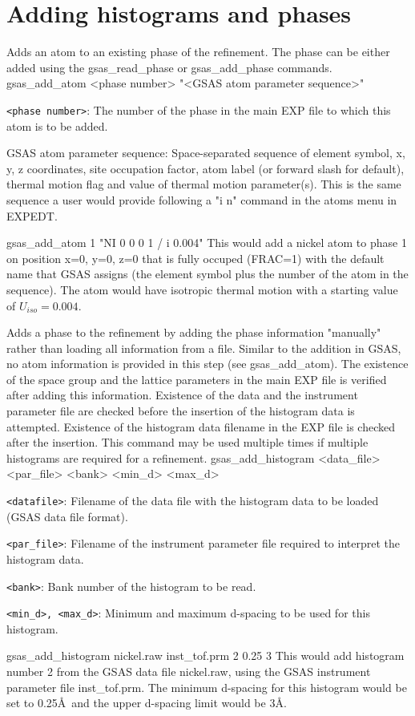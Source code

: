 \section{Adding histograms and phases}

{
Adds an atom to an existing phase of the refinement. The phase can be either added using the gsas\_read\_phase or gsas\_add\_phase commands.
}{
gsas\_add\_atom <phase number> "<GSAS atom parameter sequence>"
}{
\item \texttt{<phase number>}: The number of the phase in the main EXP file to which this atom is to be added.
\item GSAS atom parameter sequence: Space-separated sequence of element symbol, x, y, z coordinates, site occupation factor, atom label (or forward slash for default), thermal motion flag and value of thermal motion parameter(s). This is the same sequence a user would provide following a "i n" command in the atoms menu in EXPEDT.
}{
gsas\_add\_atom 1 "NI 0 0 0 1 / i 0.004"
}{
This would add a nickel atom to phase 1 on position x=0, y=0, z=0 that is fully occuped (FRAC=1) with the default name that GSAS assigns (the element symbol plus the number of the atom in the sequence). The atom would have isotropic thermal motion with a starting value of $U_{iso}=0.004$.
}

{
Adds a phase to the refinement by adding the phase information "manually" rather than loading all information from a file. Similar to the addition in GSAS, no atom information is provided in this step (see gsas\_add\_atom). The existence of the space group and the lattice parameters in the main EXP file is verified after adding this information. Existence of the data and the instrument parameter file are checked before the insertion of the histogram data is attempted. Existence of the histogram data filename in the EXP file is checked after the insertion. This command may be used multiple times if multiple histograms are required for a refinement.
}{
gsas\_add\_histogram <data\_file> <par\_file> <bank> <min\_d> <max\_d>
}{
\item \texttt{<datafile>}: Filename of the data file with the histogram data to be loaded (GSAS data file format).
\item \texttt{<par\_file>}: Filename of the instrument parameter file required to interpret the histogram data.
\item \texttt{<bank>}: Bank number of the histogram to be read.
\item \texttt{<min\_d>, <max\_d>}: Minimum and maximum d-spacing to be used for this histogram.
}{
gsas\_add\_histogram nickel.raw inst\_tof.prm 2 0.25 3
}{
This would add histogram number 2 from the GSAS data file nickel.raw, using the GSAS instrument parameter file inst\_tof.prm. The minimum d-spacing for this histogram would be set to 0.25\AA\ and the upper d-spacing limit would be 3\AA.
}


